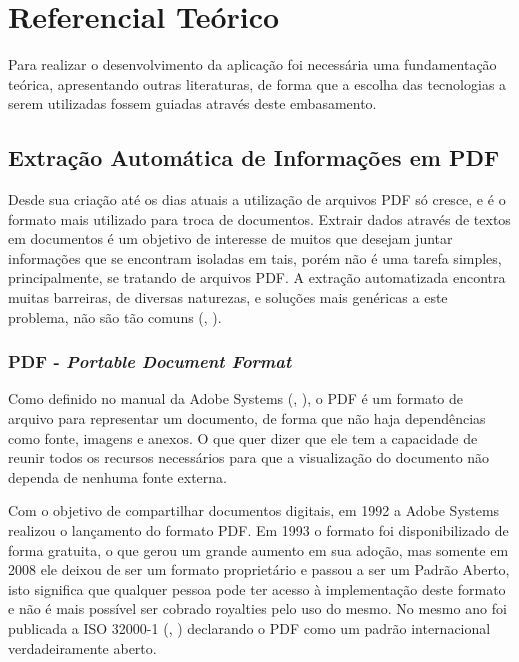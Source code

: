 \chapter{Referencial Teórico}

Para realizar o desenvolvimento da aplicação foi necessária uma fundamentação teórica, apresentando outras literaturas, de forma que a escolha das tecnologias a serem utilizadas fossem guiadas através deste embasamento.

\section{Extração Automática de Informações em PDF}

Desde sua criação até os dias atuais a utilização de arquivos PDF só cresce, e é o formato mais utilizado para troca de documentos.
Extrair dados através de textos em documentos é um objetivo de interesse de muitos que desejam juntar informações que se encontram isoladas em tais, porém não é uma tarefa simples, principalmente, se tratando de arquivos PDF. A extração automatizada encontra muitas barreiras, de diversas naturezas, e soluções mais genéricas a este problema, não são tão comuns (\citeauthor{ajedig2011pdf}, \citeyear{ajedig2011pdf}).

\subsection{PDF - \textit{Portable Document Format}} \label{PDFExp}

Como definido no manual da Adobe Systems (\citeauthor{bienz1993portable}, \citeyear{bienz1993portable}), o PDF é um formato de arquivo para representar um documento, de forma que não haja dependências como fonte, imagens e anexos. O que quer dizer que ele tem a capacidade de reunir todos os recursos necessários para que a visualização do documento não dependa de nenhuma fonte externa.

Com o objetivo de compartilhar documentos digitais, em 1992 a Adobe Systems realizou o lançamento do formato PDF. Em 1993 o formato foi disponibilizado de forma gratuita, o que gerou um grande aumento em sua adoção, mas somente em 2008 ele deixou de ser um formato proprietário e passou a ser um Padrão Aberto, isto significa que qualquer pessoa pode ter acesso à implementação deste formato e não é mais possível ser cobrado royalties pelo uso do mesmo. No mesmo ano foi publicada a ISO 32000-1 (\citeauthor{ISO32000}, \citeyear{ISO32000}) declarando o PDF como um padrão internacional verdadeiramente aberto. 

